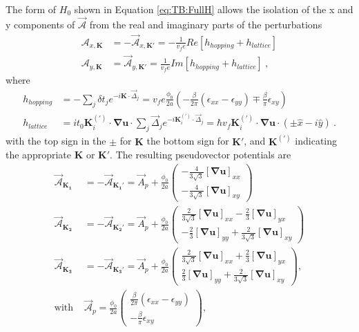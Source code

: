 The form of $H_0$ shown in Equation \ref{eq:TB:FullH} allows the isolation of the x and y components of $\vec{\mathcal{A}}$ from the real and imaginary parts of the perturbations
\begin{align}
  \mathcal{A}_{x,\bm{K}}&=-\vec{\mathcal{A}}_{x,\bm{K'}}=-\frac{1}{v_f e} Re[h_{hopping}+h_{lattice}] \nonumber \\
  \mathcal{A}_{y,\bm{K}}&=\vec{\mathcal{A}}_{y,\bm{K'}}= \frac{1}{v_f e} Im[h_{hopping}+h_{lattice}] \label{eq:PVP:AfromH}\ ,
\end{align}
where 
\begin{align}
  h_{hopping}&=-\sum_{j} \delta t_j e^{-i \bm{K} \cdot \vec{\Delta}_j}=
    v_f e \frac{\phi_0}{2a} \left(- \frac{\beta}{2 \pi} (\epsilon_{xx}-\epsilon_{yy})
    \mp \frac{\beta}{\pi} \epsilon_{xy} \right) \nonumber \\
  h_{lattice}&=i t_0  \bm{K}_i^{(')} \cdot \bm{\nabla u} \cdot \sum_{j} \vec{\Delta}_j e^{-i \bm{K}_i^{(')} \cdot \vec{\Delta}_j}
    =\hbar v_f \bm{K}_i^{(')}\cdot \bm{\nabla u} \cdot \left( \pm \hat{x}-i \hat{y}\right)  \label{eq:PVP:nocurl} \ .
\end{align}
with the top sign in the $\pm$ for $\bm{K}$ the bottom sign for $\bm{K'}$, and $\bm{K}^{(')}$ indicating the appropriate $\bm{K}$ or $\bm{K'}$.
The resulting pseudovector potentials are
\begin{align}
  \vec{\mathcal{A}}_{\bm{K_1}}&=-\vec{\mathcal{A}}_{\bm{K_1'}}=\vec{A}_p+
    \frac{\phi_0}{2a} \left( \begin{array}{c} 
      -\frac{4}{3\sqrt{3}} [\bm{\nabla u}]_{xx} \\ 
      -\frac{4}{3\sqrt{3}} [\bm{\nabla u}]_{xy}
    \end{array} \right)  \nonumber \\ 
  \vec{\mathcal{A}}_{\bm{K_2}}&=-\vec{\mathcal{A}}_{\bm{K_2'}}=\vec{A}_p+
    \frac{\phi_0}{2a} \left( \begin{array}{c} 
      \frac{2}{3\sqrt{3}}[\bm{\nabla u}]_{xx}-\frac{2}{3} [\bm{\nabla u}]_{yx} \\
      -\frac{2}{3} [\bm{\nabla u}]_{yy}+\frac{2}{3 \sqrt{3}} [\bm{\nabla u}]_{xy}
    \end{array} \right)  \nonumber \\
  \vec{\mathcal{A}}_{\bm{K_3}}&=-\vec{\mathcal{A}}_{\bm{K_3'}}=\vec{A}_p+
    \frac{\phi_0}{2a} \left( \begin{array}{c}
      \frac{2}{3\sqrt{3}}[\bm{\nabla u}]_{xx}+\frac{2}{3} [\bm{\nabla u}]_{yx} \\
      \frac{2}{3} [\bm{\nabla u}]_{yy}+\frac{2}{3 \sqrt{3}} [\bm{\nabla u}]_{xy}
    \end{array} \right)  , \nonumber \\
  \textrm{with }
  &\vec{\mathcal{A}}_p= 
    \frac{\phi_0}{2a} \left( \begin{array}{c} 
      \frac{\beta }{2 \pi} (\epsilon_{xx}-\epsilon_{yy}) \\
      -\frac{\beta}{\pi} \epsilon_{xy}
    \end{array} \right),
  \label{eq:PVP:PVP}
\end{align}
